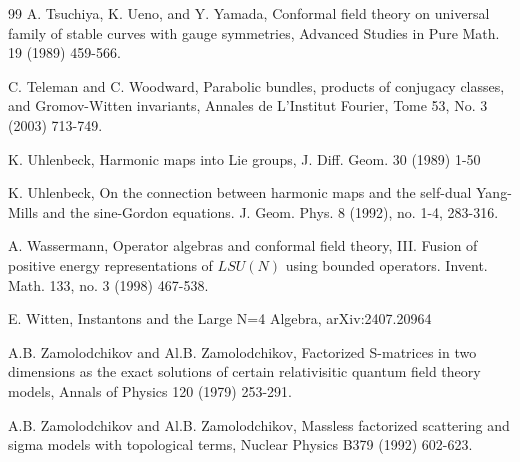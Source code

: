 \documentclass{amsart}
\theoremstyle{conjecture}
\theoremstyle{definition}
\theoremstyle{question}
\theoremstyle{questions}
\theoremstyle{remark}
\theoremstyle{remarks}
\theoremstyle{example}
\numberwithin{equation}{section}
\begin{document}
\begin{thebibliography}{99}
 A.  Tsuchiya, K.  Ueno, and Y.  Yamada,
Conformal field theory on universal family of stable
curves with gauge symmetries, Advanced Studies in Pure
Math.  19 (1989) 459-566.

 C. Teleman and C. Woodward, Parabolic bundles, products of conjugacy classes,
and Gromov-Witten invariants, Annales de L'Institut Fourier, Tome 53, No. 3 (2003) 713-749.


 K. Uhlenbeck, Harmonic maps into Lie groups, J. Diff. Geom. 30 (1989) 1-50

 K. Uhlenbeck, On the connection between harmonic maps and the self-dual Yang-Mills and the sine-Gordon equations. J. Geom. Phys. 8 (1992), no. 1-4, 283-316.


 A. Wassermann, Operator algebras and conformal field theory, III.
Fusion of positive energy representations of $LSU(N)$ using bounded operators.
Invent. Math. 133, no. 3 (1998) 467-538.

E. Witten, Instantons and the Large N=4 Algebra, arXiv:2407.20964

 A.B. Zamolodchikov and Al.B. Zamolodchikov, Factorized S-matrices in
two dimensions as the exact solutions of certain
relativisitic quantum field theory models, Annals of
Physics 120 (1979) 253-291.

 A.B. Zamolodchikov and Al.B. Zamolodchikov,
Massless factorized scattering and sigma models with topological terms,
Nuclear Physics B379 (1992) 602-623.


\end{thebibliography}
\end{document}
